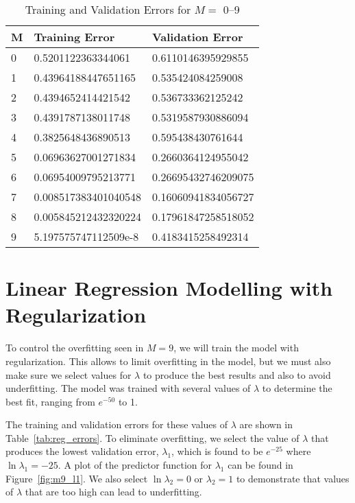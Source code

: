 \documentclass[12pt]{article}
\begin{document}
\begin{table}[htp]
    \centering
    \begin{tabular}{|l|l|l|}
    \hline
    M & Training Error       & Validation Error    \\ \hline
    0 & 0.5201122363344061   & 0.6110146395929855 \\ \hline
    1 & 0.43964188447651165  & 0.535424084259008  \\ \hline
    2 & 0.4394652414421542   & 0.536733362125242  \\ \hline
    3 & 0.4391787138011748   & 0.5319587930886094  \\ \hline
    4 & 0.3825648436890513   & 0.595438430761644 \\ \hline
    5 & 0.06963627001271834  & 0.2660364124955042  \\ \hline
    6 & 0.06954009795213771  & 0.26695432746209075  \\ \hline
    7 & 0.008517383401040548 & 0.16060941834056727  \\ \hline
    8 & 0.005845212432320224 & 0.17961847258518052 \\ \hline
    9 & 5.197575747112509e-8 & 0.4183415258492314   \\ \hline
    \end{tabular}
\caption{Training and Validation Errors for $M =$ 0--9}
\label{tab:errors}
\end{table}
\clearpage

\section*{Linear Regression Modelling with Regularization}
To control the overfitting seen in $M = 9$, we will train the model with regularization. This allows to limit overfitting in the model, but we must also make sure we select values for $\lambda$ to produce the best results and also to avoid underfitting. The model was trained with several values of $\lambda$ to determine the best fit, ranging from $e^{-50}$ to 1. 

The training and validation errors for these values of $\lambda$ are shown in Table~\ref{tab:reg_errors}. To eliminate overfitting, we select the value of $\lambda$ that produces the lowest validation error, $\lambda_1$, which is found to be $e^{-25}$ where $\ln \lambda_1 = -25$. A plot of the predictor function for $\lambda_1$ can be found in Figure~\ref{fig:m9_l1}. We also select $\ln \lambda_2 = 0$ or $\lambda_2 = 1$ to demonstrate that values of $\lambda$ that are too high can lead to underfitting.
\end{document}
